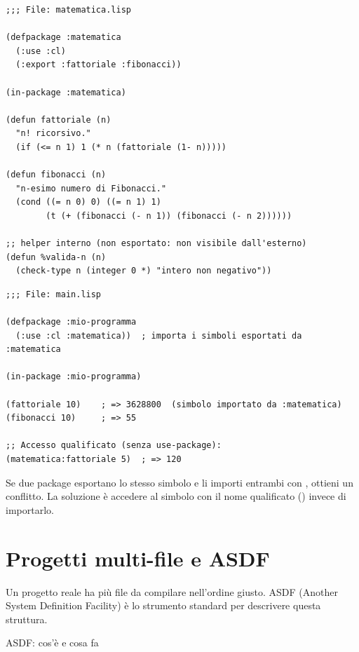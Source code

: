 \begin{esempio}
\begin{lstlisting}
;;; File: matematica.lisp

(defpackage :matematica
  (:use :cl)
  (:export :fattoriale :fibonacci))

(in-package :matematica)

(defun fattoriale (n)
  "n! ricorsivo."
  (if (<= n 1) 1 (* n (fattoriale (1- n)))))

(defun fibonacci (n)
  "n-esimo numero di Fibonacci."
  (cond ((= n 0) 0) ((= n 1) 1)
        (t (+ (fibonacci (- n 1)) (fibonacci (- n 2))))))

;; helper interno (non esportato: non visibile dall'esterno)
(defun %valida-n (n)
  (check-type n (integer 0 *) "intero non negativo"))
\end{lstlisting}

\begin{lstlisting}
;;; File: main.lisp

(defpackage :mio-programma
  (:use :cl :matematica))  ; importa i simboli esportati da :matematica

(in-package :mio-programma)

(fattoriale 10)    ; => 3628800  (simbolo importato da :matematica)
(fibonacci 10)     ; => 55

;; Accesso qualificato (senza use-package):
(matematica:fattoriale 5)  ; => 120
\end{lstlisting}
\end{esempio}

\begin{attenzione}
Se due package esportano lo stesso simbolo e li importi
entrambi con , ottieni un conflitto.
La soluzione è accedere al simbolo con il nome qualificato
() invece di importarlo.
\end{attenzione}

\section{Progetti multi-file e ASDF}

Un progetto reale ha più file da compilare nell'ordine giusto.
ASDF (Another System Definition Facility) è lo strumento
standard per descrivere questa struttura.

\begin{concetto}{ASDF: cos'è e cosa fa}
\end{concetto}

